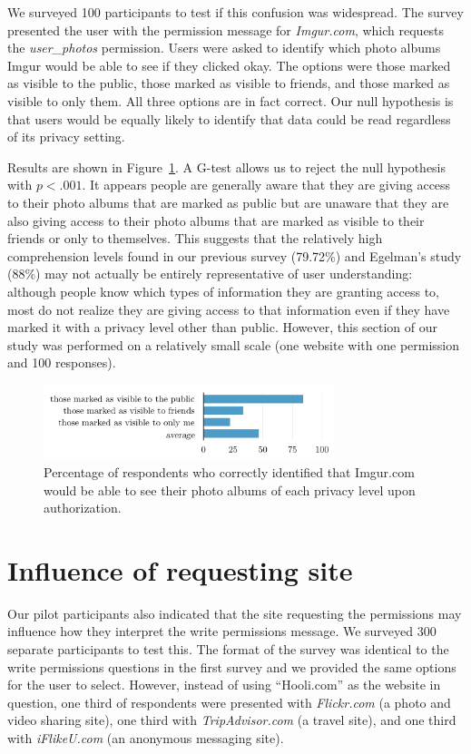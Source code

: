 \documentclass[twoside,letterpaper]{soups-poster}
\begin{document}
We surveyed 100 participants to test if this confusion was widespread. The survey presented the user with the permission message for \emph{Imgur.com}, which requests the \emph{user\_photos} permission. Users were asked to identify which photo albums Imgur would be able to see if they clicked okay. The options were those marked as visible to the public, those marked as visible to friends, and those marked as visible to only them. All three options are in fact correct.
Our null hypothesis is that users would be equally likely to identify that data could be read regardless of its privacy setting.

Results are shown in Figure~\ref{figure:privacypercents}. A G-test allows us to reject the null hypothesis with $p < .001$.
It appears people are generally aware that they are giving access to their photo albums that are marked as public but are unaware that they are also giving access to their photo albums that are marked as visible to their friends or only to themselves.
This suggests that the relatively high comprehension levels found in our previous survey (79.72\%) and Egelman's study (88\%) \cite{egelman} may not actually be entirely representative of user understanding: although people know which types of information they are granting access to, most do not realize they are giving access to that information even if they have marked it with a privacy level other than public. However, this section of our study was performed on a relatively small scale (one website with one permission and 100 responses).

\begin{figure}[h!]
  \centering
  \includegraphics[width=8.5cm]{privacy_percents_cosn}
  \caption{Percentage of respondents who correctly identified that Imgur.com would be able to see their photo albums of each privacy level upon authorization.}
  \label{figure:privacypercents}
\end{figure}

\section{Influence of requesting site}

Our pilot participants also indicated that the site requesting the permissions may influence how they interpret the write permissions message. 
We surveyed 300 separate participants to test this. The format of the survey was identical to the write permissions questions in the first survey and we provided the same options for the user to select. However, instead of using ``Hooli.com'' as the website in question, one third of respondents were presented with \emph{Flickr.com} (a photo and video sharing site), one third with \emph{TripAdvisor.com} (a travel site), and one third with \emph{iFlikeU.com} (an anonymous messaging site).
\end{document}
